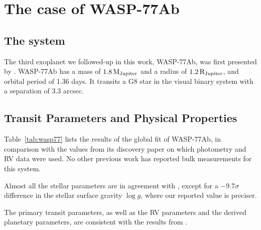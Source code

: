 \chapter{The case of WASP-77Ab}\label{chap:wasp77}

\section{The system}
The third exoplanet we followed-up in this work, WASP-77Ab, was first presented by \cite{Maxted2013}. WASP-77Ab has a mass of $1.8\,{\rm M_{Jupiter}}$ and a radius of $1.2\,{\rm R_{Jupiter}}$, and orbital period of 1.36 days. It transits a G8 star in the visual binary system with a separation of 3.3 arcsec.

\section{Transit Parameters and Physical Properties}
Table~\ref{tab:wasp77} lists the results of the global fit of WASP-77Ab, in comparison with the values from its discovery paper \citep{Maxted2013} on which photometry and RV data were used. No other previous work has reported bulk measurements for this system.

Almost all the stellar parameters are in agreement with \citep{Maxted2013}, except for a $-9.7\sigma$ difference in the stellar surface gravity $\log{g}$, where our reported value is preciser.  

The primary transit parameters, as well as the RV parameters and the derived planetary parameters, are consistent with the results from \cite{Maxted2013}.


